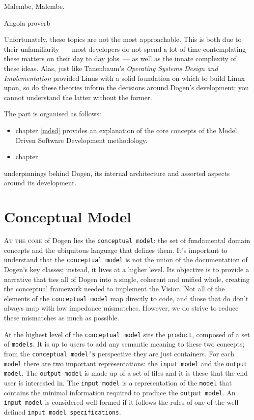 \documentclass{book}
\begin{document}
\epigraph{Malembe, Malembe.}{Angola proverb}

Unfortunately, these topics are not the most approachable. This is
both due to their unfamiliarity~--- most developers do not spend a lot
of time contemplating these matters on their day to day jobs~--- as
well as the innate complexity of these ideas. Alas, just like
Tanenbaum's \emph{Operating Systems Design and Implementation}
provided Linus with a solid foundation on which to build Linux upon,
so do these theories inform the decisions around Dogen's development;
you cannot understand the latter without the former.

The part is organised as follows:

\begin{itemize}
  \item chapter \ref{mdsd} provides an explanation of the core
    concepts of the Model Driven Software Development methodology.
  \item chapter
\end{itemize}

underpinnings behind Dogen, its internal architecture and assorted
aspects around its development.

\chapter{Conceptual Model}

\lettrine{A}{t the core} of Dogen lies the \texttt{conceptual model}:
the set of fundamental domain concepts and the ubiquitous language
that defines them. It's important to understand that the
\texttt{conceptual model} is not the union of the documentation of
Dogen's key classes; instead, it lives at a higher level. Its
objective is to provide a narrative that ties all of Dogen into a
single, coherent and unified whole, creating the conceptual framework
needed to implement the Vision. Not all of the elements of the
\texttt{conceptual model} map directly to code, and those that do
don't always map with low impedance mismatches. However, we do strive
to reduce these mismatches as much as possible.

At the highest level of the \texttt{conceptual model} sits the
\texttt{product}, composed of a set of \texttt{models}. It is up to
users to add any semantic meaning to these two concepts; from the
\texttt{conceptual model's} perspective they are just containers. For
each \texttt{model} there are two important representations: the
\texttt{input model} and the \texttt{output model}. The \texttt{output
  model} is made up of a set of files and it is these that the end
user is interested in. The \texttt{input model} is a representation of
the \texttt{model} that contains the minimal information required to
produce the \texttt{output model}. An \texttt{input model} is
considered well-formed if it follows the rules of one of the
well-defined \texttt{input model specifications}.
\end{document}
